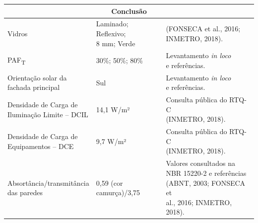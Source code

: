 \begin{table}[ht]\centering
    \begin{tabular*}{\columnwidth}{@{\extracolsep{\fill}}lll}
    \hline
    \multicolumn{3}{c}{Conclusão}\\\hline
    Vidros                                                         & \makecell[l]{Laminado; Reflexivo;\\ 8 mm; Verde}                                      & \makecell[l]{(FONSECA et al., 2016; \\INMETRO, 2018).}                                                                                                                   \\ \hline
    PAF\textsubscript{T}                                           & 30\%; 50\%; 80\%                                                                      & \makecell[l]{Levantamento \textit{in loco}\\ e referências.}                                                                                                             \\ \hline
    \makecell[l]{Orientação solar da \\fachada principal}          & Sul                                                                                   & \makecell[l]{Levantamento \textit{in loco}\\ e referências.}                                                                                                             \\ \hline
    \makecell[l]{Densidade de Carga de\\ Iluminação Limite – DCIL} & 14,1 W/m²                                                                             & \makecell[l]{Consulta pública do RTQ-C \\(INMETRO, 2018).}                                                                                                               \\ \hline
    \makecell[l]{Densidade de Carga de\\ Equipamentos – DCE}       & 9,7 W/m²                                                                              & \makecell[l]{Consulta pública do RTQ-C \\(INMETRO, 2018).}                                                                                                               \\ \hline
    \makecell[l]{Absortância/transmitância \\das paredes}          & \makecell[l]{0,59 (cor \\camurça)/3,75}                                               & \makecell[l]{Valores consultados na \\NBR 15220-2 e referências \\(ABNT, 2003; FONSECA et \\al., 2016; INMETRO, 2018).}                                                                     \\ \hline

\end{tabular*}
\end{table}

